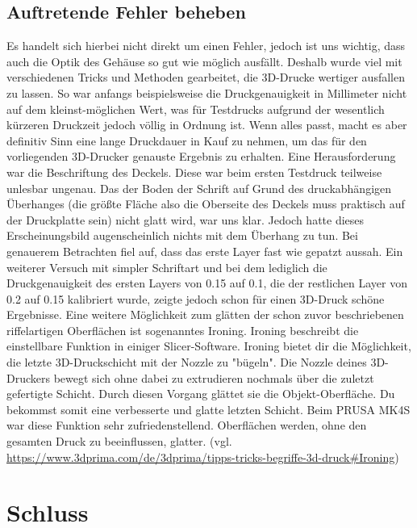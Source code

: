 \documentclass[11pt, twoside]{article}
\begin{document}
\subsection{Auftretende Fehler beheben}
Es handelt sich hierbei nicht direkt um einen Fehler, jedoch ist uns wichtig, dass auch die Optik des Gehäuse so gut wie möglich ausfällt. Deshalb wurde viel mit verschiedenen Tricks und Methoden gearbeitet, die 3D-Drucke wertiger ausfallen zu lassen.\newline
So war anfangs beispielsweise die Druckgenauigkeit in Millimeter nicht auf dem kleinst-möglichen Wert, was für Testdrucks aufgrund der wesentlich kürzeren Druckzeit jedoch völlig in Ordnung ist. Wenn alles passt, macht es aber definitiv Sinn eine lange Druckdauer in Kauf zu nehmen, um das für den vorliegenden 3D-Drucker genauste Ergebnis zu erhalten.\newline
Eine Herausforderung war die Beschriftung des Deckels. Diese war beim ersten Testdruck teilweise unlesbar ungenau. Das der \glqq Boden\grqq{} der Schrift auf Grund des druckabhängigen Überhanges (die größte Fläche also die Oberseite des Deckels muss praktisch auf der Druckplatte sein) nicht glatt wird, war uns klar. Jedoch hatte dieses Erscheinungsbild augenscheinlich nichts mit dem Überhang zu tun. Bei genauerem Betrachten fiel auf, dass das erste Layer fast wie gepatzt aussah. Ein weiterer Versuch mit simpler Schriftart und bei dem lediglich die Druckgenauigkeit des ersten Layers von 0.15 auf 0.1, die der restlichen Layer von 0.2 auf 0.15 kalibriert wurde, zeigte jedoch schon für einen 3D-Druck schöne Ergebnisse.\newline
Eine weitere Möglichkeit zum glätten der schon zuvor beschriebenen riffelartigen Oberflächen ist sogenanntes Ironing. \glqq Ironing beschreibt die einstellbare Funktion in einiger Slicer-Software. Ironing bietet dir die Möglichkeit, die letzte 3D-Druckschicht mit der Nozzle zu "bügeln". Die Nozzle deines 3D-Druckers bewegt sich ohne dabei zu extrudieren nochmals über die zuletzt gefertigte Schicht. Durch diesen Vorgang glättet sie die Objekt-Oberfläche. Du bekommst somit eine verbesserte und glatte letzten Schicht.\grqq{} Beim PRUSA MK4S war diese Funktion sehr zufriedenstellend. Oberflächen werden, ohne den gesamten Druck zu beeinflussen, glatter.\newline
\vspace{4mm}\newline
(vgl. \url{https://www.3dprima.com/de/3dprima/tipps-tricks-begriffe-3d-druck#Ironing})
\section{Schluss}
\end{document}
